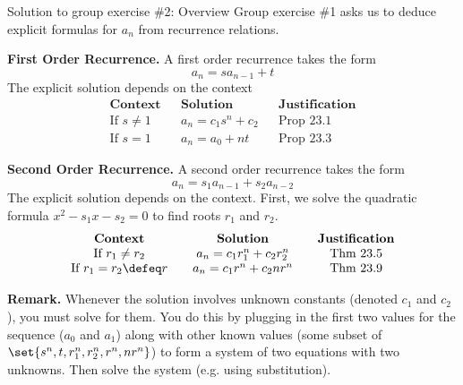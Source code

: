 \documentclass[10pt]{beamer}
\begin{document}
\begin{frame}{Solution to group exercise \#2: Overview}
\footnotesize 
Group exercise \#1 asks us to deduce explicit formulas for $a_n$ from recurrence relations.  

\vfill 

\colorbox{green!30}{\textbf{First Order Recurrence.}} A first order recurrence takes the form
\[ a_n = s a_{n-1}+ t\]
The explicit solution depends on the context 
\[
\begin{array}{cccccc}
\textbf{Context} && \textbf{Solution} && \textbf{Justification} \\
\text{If } s \neq 1 & & a_n = c_1 s^n + c_2 && \text{Prop 23.1} \\
\text{If } s =1 & & a_n = a_0 + nt && \text{Prop 23.3} 
\end{array}
\]

\vfill 

\colorbox{green!30}{\textbf{Second Order Recurrence.}}  A second order recurrence takes the form
\[ a_n = s_1 a_{n-1} + s_2 a_{n-2} \]
The explicit solution depends on the context. First, we solve the quadratic formula $x^2 - s_1 x - s_2 =0$ to find roots $r_1$ and $r_2$.
\[
\begin{array}{cccccc}
\textbf{Context} && \textbf{Solution} && \textbf{Justification} \\
\text{If } r_1 \neq r_2  & & a_n = c_1 r_1^n + c_2 r_2^n && \text{Thm 23.5} \\
\text{If } r_1 = r_2 \defeq r & & a_n = c_1 r^n + c_2 n r^n && \text{Thm 23.9} 
\end{array}
\]

\vfill 

\colorbox{red!30}{\textbf{Remark.}} Whenever the solution involves unknown constants (denoted $c_1$ and $c_2$), you must solve for them. You do this by plugging in the first two values for the sequence ($a_0$ and $a_1$) along with other known values (some subset of $\set{s^n, t, r_1^n, r_2^n, r^n, nr^n}$) to form a system of two equations with two unknowns.  Then solve the system (e.g. using substitution).   

\end{frame}
\end{document}

